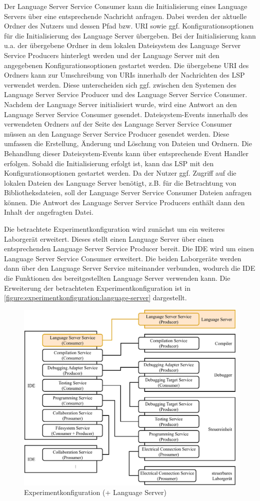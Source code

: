 Der Language Server Service Consumer kann die Initialisierung eines Language Servers über eine entsprechende Nachricht anfragen. Dabei werden der aktuelle Ordner des Nutzers und dessen Pfad bzw. URI sowie ggf. Konfigurationsoptionen für die Initialisierung des Language Server übergeben. Bei der Initialisierung kann u.a. der übergebene Ordner in dem lokalen Dateisystem des Language Server Service Producers hinterlegt werden und der Language Server mit den angegebenen Konfigurationsoptionen gestartet werden. Die übergebene URI des Ordners kann zur Umschreibung von URIs innerhalb der Nachrichten des \ac{LSP} verwendet werden. Diese unterscheiden sich ggf. zwischen den Systemen des Language Server Service Producer und des Language Server Service Consumer. Nachdem der Language Server initialisiert wurde, wird eine Antwort an den Language Server Service Consumer gesendet. Dateisystem-Events innerhalb des verwendeten Ordners auf der Seite des Language Server Service Consumer müssen an den Language Server Service Producer gesendet werden. Diese umfassen die Erstellung, Änderung und Löschung von Dateien und Ordnern. Die Behandlung dieser Dateisystem-Events kann über entsprechende Event Handler erfolgen. Sobald die Initialisierung erfolgt ist, kann das \ac{LSP} mit den Konfigurationsoptionen gestartet werden. Da der Nutzer ggf. Zugriff auf die lokalen Dateien des Language Server benötigt, z.B. für die Betrachtung von Bibliotheksdateien, soll der Language Server Service Consumer Dateien anfragen können. Die Antwort des Language Server Service Producers enthält dann den Inhalt der angefragten Datei.

Die betrachtete Experimentkonfiguration wird zunächst um ein weiteres Laborgerät erweitert. Dieses stellt einen Language Server über einen entsprechenden Language Server Service Producer bereit. Die IDE wird um einen Language Server Service Consumer erweitert. Die beiden Laborgeräte werden dann über den Language Server Service miteinander verbunden, wodurch die IDE die Funktionen des bereitgestellten Language Server verwenden kann. Die Erweiterung der betrachteten Experimentkonfiguration ist in \autoref{figure:experimentkonfiguration:language-server} dargestellt.

\begin{figure}[tbp]
    \centering
    \includegraphics[width=\textwidth]{diagrams/experimentkonfigurationen/Experimentkonfiguration-06.drawio.pdf}
    \caption{Experimentkonfiguration (+ Language Server)}
    \label{figure:experimentkonfiguration:language-server}
\end{figure}